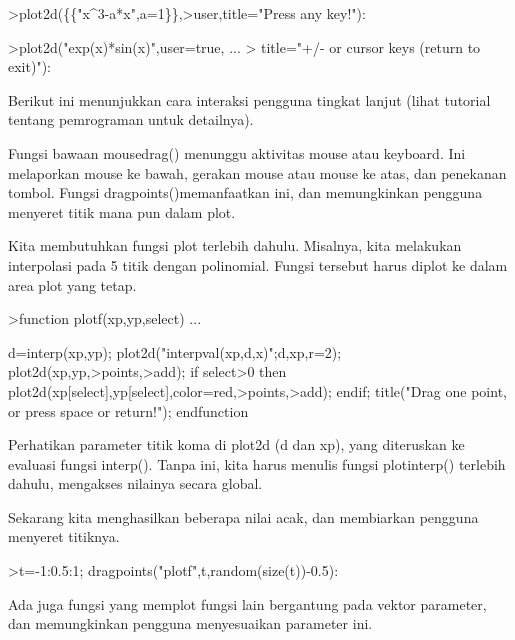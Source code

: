 \documentclass{article}
\begin{document}
\begin{eulernotebook}
\begin{eulercomment}
\begin{eulercomment}
\begin{eulercomment}
\begin{eulercomment}
\begin{eulercomment}
\begin{eulercomment}
\begin{eulercomment}
\end{eulercomment}
\begin{eulerprompt}
>plot2d(\{\{"x^3-a*x",a=1\}\},>user,title="Press any key!"):
\end{eulerprompt}
\begin{eulerprompt}
>plot2d("exp(x)*sin(x)",user=true, ...
>  title="+/- or cursor keys (return to exit)"):
\end{eulerprompt}
\begin{eulercomment}
Berikut  ini  menunjukkan  cara  interaksi  pengguna  tingkat  lanjut
(lihat  tutorial  tentang  pemrograman  untuk  detailnya).

Fungsi  bawaan  mousedrag()  menunggu  aktivitas  mouse  atau
keyboard. Ini  melaporkan  mouse  ke  bawah,  gerakan  mouse  atau
mouse  ke atas, dan  penekanan  tombol. Fungsi
dragpoints()memanfaatkan  ini, dan  memungkinkan  pengguna  menyeret
titik  mana pun  dalam  plot.

Kita  membutuhkan  fungsi  plot  terlebih  dahulu.  Misalnya,  kita
melakukan  interpolasi  pada  5  titik  dengan  polinomial. Fungsi
tersebut  harus  diplot  ke  dalam  area  plot  yang  tetap.
\end{eulercomment}
\begin{eulerprompt}
>function plotf(xp,yp,select) ...
\end{eulerprompt}
\begin{eulerudf}
    d=interp(xp,yp);
    plot2d("interpval(xp,d,x)";d,xp,r=2);
    plot2d(xp,yp,>points,>add);
    if select>0 then
      plot2d(xp[select],yp[select],color=red,>points,>add);
    endif;
    title("Drag one point, or press space or return!");
  endfunction
\end{eulerudf}
\begin{eulercomment}
Perhatikan  parameter  titik  koma  di  plot2d  (d  dan  xp),  yang
diteruskan  ke  evaluasi  fungsi  interp(). Tanpa  ini,  kita  harus
menulis  fungsi  plotinterp()  terlebih  dahulu,  mengakses  nilainya
secara  global.

Sekarang  kita  menghasilkan  beberapa  nilai  acak,  dan  membiarkan
pengguna  menyeret  titiknya.
\end{eulercomment}
\begin{eulerprompt}
>t=-1:0.5:1; dragpoints("plotf",t,random(size(t))-0.5):
\end{eulerprompt}
\begin{eulercomment}
Ada  juga  fungsi  yang  memplot  fungsi  lain  bergantung  pada
vektor parameter,  dan  memungkinkan  pengguna  menyesuaikan parameter
ini.


\end{eulercomment}
\end{eulercomment}
\end{eulercomment}
\end{eulercomment}
\end{eulercomment}
\end{eulercomment}
\end{eulercomment}
\end{eulernotebook}
\end{document}
